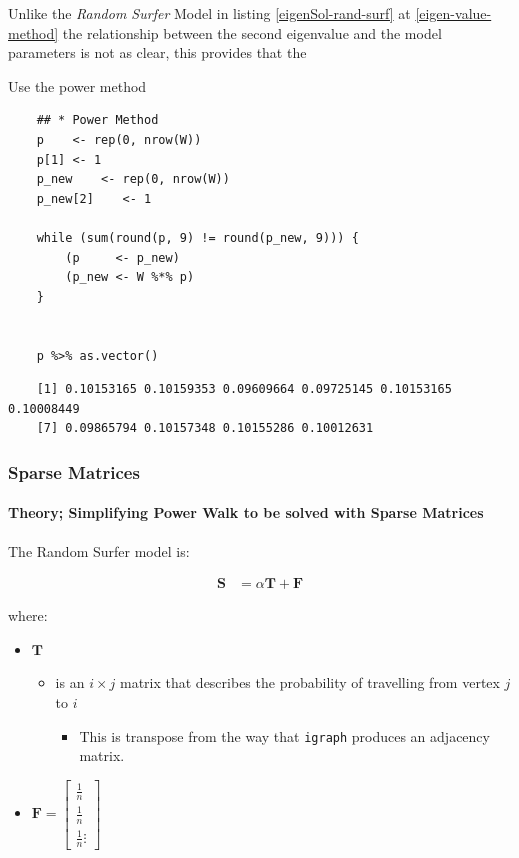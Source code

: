 \documentclass[11pt]{report}
\begin{document}
Unlike the \emph{Random Surfer} Model in listing \ref{eigenSol-rand-surf} at \ref{eigen-value-method} the relationship between the second eigenvalue and the model parameters is not as clear, this provides that the

Use the power method

\begin{tcolorbox}
    \begin{verbatim}
    ## * Power Method
    p    <- rep(0, nrow(W))
    p[1] <- 1
    p_new    <- rep(0, nrow(W))
    p_new[2]    <- 1

    while (sum(round(p, 9) != round(p_new, 9))) {
        (p     <- p_new)
        (p_new <- W %*% p)
    }


    p %>% as.vector()
    \end{verbatim}
\tcblower
    \begin{verbatim}
    [1] 0.10153165 0.10159353 0.09609664 0.09725145 0.10153165 0.10008449
    [7] 0.09865794 0.10157348 0.10155286 0.10012631
    \end{verbatim}
\end{tcolorbox}

\subsubsection{Sparse Matrices}
\label{sec:org5192cbb}
\paragraph{Theory; Simplifying Power Walk to be solved with Sparse Matrices}
\label{sec:org82fb181}
The Random Surfer model is:

$$\begin{aligned}
    \mathbf{S} &= \alpha \mathbf{T} +  \mathbf{F}  \label{eq:sparse-RS}\end{aligned}$$

where:

\begin{itemize}
\item \(\mathbf{T}\)

\begin{itemize}
\item is an \(i \times j\) matrix that describes the probability of
travelling from vertex \(j\) to \(i\)

\begin{itemize}
\item This is transpose from the way that \texttt{igraph} produces an adjacency
matrix.
\end{itemize}
\end{itemize}

\item \(\mathbf{F} = \begin{bmatrix} \frac{1}{n} \\ \frac{1}{n} \\ \frac{1}{n} \vdots \end{bmatrix}\)
\end{itemize}
\end{document}
